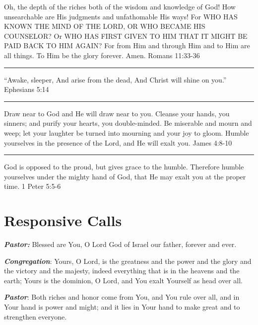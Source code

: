\documentclass[]{book}
\begin{document}
Oh, the depth of the riches both of the wisdom and knowledge of God! How unsearchable are His judgments and unfathomable His ways! For WHO HAS KNOWN THE MIND OF THE LORD, OR WHO BECAME HIS COUNSELOR? Or WHO HAS FIRST GIVEN TO HIM THAT IT MIGHT BE PAID BACK TO HIM AGAIN? For from Him and through Him and to Him are all things. To Him be the glory forever. Amen. \textbar{} Romans 11:33-36

\begin{center}\rule{0.5\linewidth}{\linethickness}\end{center}

``Awake, sleeper,
And arise from the dead,
And Christ will shine on you.'' \textbar{} Ephesians 5:14

\begin{center}\rule{0.5\linewidth}{\linethickness}\end{center}

Draw near to God and He will draw near to you. Cleanse your hands, you sinners; and purify your hearts, you double-minded. Be miserable and mourn and weep; let your laughter be turned into mourning and your joy to gloom. Humble yourselves in the presence of the Lord, and He will exalt you. \textbar{} James 4:8-10

\begin{center}\rule{0.5\linewidth}{\linethickness}\end{center}

God is opposed to the proud, but gives grace to the humble. Therefore humble yourselves under the mighty hand of God, that He may exalt you at the proper time. \textbar{} 1 Peter 5:5-6

\hypertarget{responsive-calls}{%
\section*{Responsive Calls}\label{responsive-calls}}

\textbf{\emph{Pastor:}} Blessed are You, O Lord God of Israel our father, forever and ever.

\textbf{\emph{Congregation}}: Yours, O Lord, is the greatness and the power and the glory and the victory and the majesty, indeed everything that is in the heavens and the earth; Yours is the dominion, O Lord, and You exalt Yourself as head over all.

\textbf{\emph{Pastor}}: Both riches and honor come from You, and You rule over all, and in Your hand is power and might; and it lies in Your hand to make great and to strengthen everyone.
\end{document}
